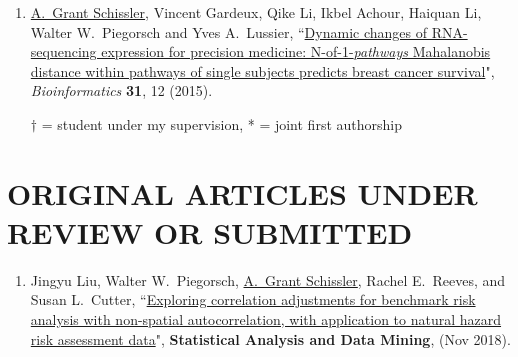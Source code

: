 \documentclass[paper=a4,fontsize=11pt]{scrartcl} %
\newcommand{\NewPart}[2]{\section*{\uppercase{#1} #2 }}
\newcommand{\PaperEntry}[7]{
		\noindent #1, ``\href{#7}{#2}", \textit{#3} \textbf{#4}, #5 (#6).}
\begin{document}
\begin{enumerate}
\item \PaperEntry{\underline{A.~Grant Schissler}, Vincent Gardeux, Qike Li, Ikbel Achour, Haiquan Li, Walter W.~Piegorsch and Yves A.~Lussier}{Dynamic changes of RNA-sequencing expression for precision medicine: N-of-1-\textit{pathways} Mahalanobis distance within pathways of single subjects predicts breast cancer survival}{Bioinformatics}{31}{12}{2015}{http://bioinformatics.oxfordjournals.org/content/31/12/i293.full}

  $\dagger$ = student under my supervision, * = joint first authorship
\end{enumerate}


\NewPart{Original articles under review or submitted}{}
\vspace{-7pt}
\begin{enumerate}

\item \PaperEntry{Jingyu Liu, Walter W.~Piegorsch, \underline{A.~Grant Schissler}, Rachel E.~Reeves, and Susan L.~Cutter}{Exploring correlation adjustments for benchmark risk analysis with non-spatial autocorrelation, with  application to natural hazard risk assessment data}{}{Statistical Analysis and Data Mining}{}{Nov 2018}{}

  
\end{enumerate}


\end{document}
